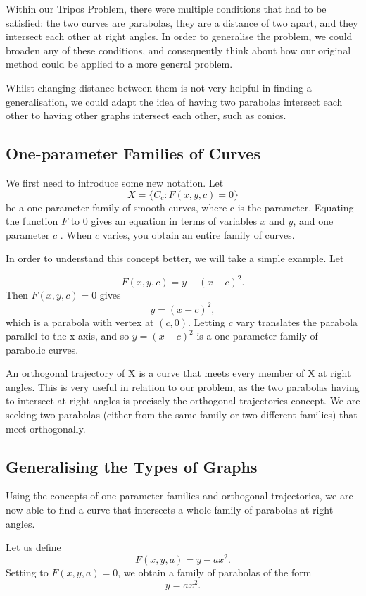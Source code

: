 \documentclass[a4paper,11pt]{article}
\theoremstyle{definition}
\begin{document}
Within our Tripos Problem, there were multiple conditions that had to be satisfied: the two curves are parabolas, they are a distance of two apart, and they intersect each other at right angles. 
In order to generalise the problem, we could broaden any of these conditions, and consequently think about how our original method could be applied to a more general problem.

Whilst changing distance between them is not very helpful in finding a generalisation, we could adapt the idea of having two parabolas intersect each other to having other graphs intersect each other, such as conics.

\subsection{One-parameter Families of Curves}

\noindent We first need to introduce some new notation. 
Let 
$$X=\{C_c:F(x,y,c)=0\}$$
be a one-parameter family of smooth curves, where c is the parameter. Equating the function $F$ to 0 gives an equation in terms of variables $x$ and $y$, and one parameter $c$ \citep{libretexts}. When $c$ varies, you obtain an entire family of curves.

\noindent In order to understand this concept better, we will take a simple example.
\noindent Let

$$F(x,y,c)=y-(x-c)^2.$$
Then $F(x,y,c)=0$ gives 
$$y=(x-c)^2,$$
which is a parabola with vertex at $(c,0)$. Letting $c$ vary translates the parabola parallel to the x-axis, and so $y=(x-c)^2$ is a one-parameter family of  parabolic curves.

An orthogonal trajectory of X is a curve that meets every member of X at right angles. This is very useful in relation to our problem, as the two parabolas having to intersect at right angles is precisely the orthogonal-trajectories concept. We are seeking two parabolas (either from the same family or two different families) that meet orthogonally.

\subsection{Generalising the Types of Graphs}

\noindent Using the concepts of one-parameter families and orthogonal trajectories, we are now able to find a curve that intersects a whole family of parabolas at right angles. 

\noindent Let us define $$F(x,y,a)=y-ax^2.$$
Setting to $F(x,y,a)=0$, we obtain a family of parabolas of the form $$y=ax^2.$$
\end{document}
